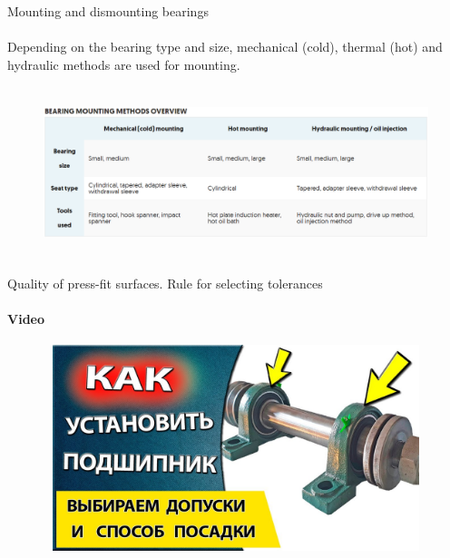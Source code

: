 \documentclass[aspectratio=169]{beamer}
\begin{document}
\begin{frame}[t]{Mounting and dismounting bearings}
\framesubtitle{}
Depending on the bearing type and size, mechanical (cold), thermal (hot) and hydraulic methods are used for mounting. 

\begin{figure}[H]
    \centering\includegraphics[height=5cm,width=1\textwidth,keepaspectratio]{bearingmountingmethods.png}
    \label{fig:bearingmountingmethods.png}
\end{figure}
\end{frame}

\begin{frame}[t]{Quality of press-fit surfaces. Rule for selecting tolerances}
    \framesubtitle{Video}
    \vspace{-0.6cm}
    \begin{figure}[H]
        \href{https://www.youtube.com/watch?v=UAVXJHjPqKk}{
            \centering\includegraphics[height=6cm,width=1\textwidth,keepaspectratio]{posadka_video.jpg}}
        \label{fig:posadka_video.jpg}
    \end{figure}
\end{frame}
\end{document}
